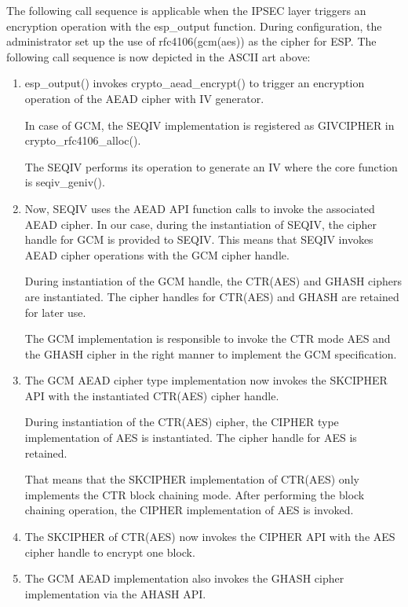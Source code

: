 \documentclass[a4paper,8pt,english]{sphinxmanual}
\begin{document}
The following call sequence is applicable when the IPSEC layer triggers
an encryption operation with the esp\_output function. During
configuration, the administrator set up the use of rfc4106(gcm(aes)) as
the cipher for ESP. The following call sequence is now depicted in the
ASCII art above:
\begin{enumerate}
\item {} 
esp\_output() invokes crypto\_aead\_encrypt() to trigger an
encryption operation of the AEAD cipher with IV generator.

In case of GCM, the SEQIV implementation is registered as GIVCIPHER
in crypto\_rfc4106\_alloc().

The SEQIV performs its operation to generate an IV where the core
function is seqiv\_geniv().

\item {} 
Now, SEQIV uses the AEAD API function calls to invoke the associated
AEAD cipher. In our case, during the instantiation of SEQIV, the
cipher handle for GCM is provided to SEQIV. This means that SEQIV
invokes AEAD cipher operations with the GCM cipher handle.

During instantiation of the GCM handle, the CTR(AES) and GHASH
ciphers are instantiated. The cipher handles for CTR(AES) and GHASH
are retained for later use.

The GCM implementation is responsible to invoke the CTR mode AES and
the GHASH cipher in the right manner to implement the GCM
specification.

\item {} 
The GCM AEAD cipher type implementation now invokes the SKCIPHER API
with the instantiated CTR(AES) cipher handle.

During instantiation of the CTR(AES) cipher, the CIPHER type
implementation of AES is instantiated. The cipher handle for AES is
retained.

That means that the SKCIPHER implementation of CTR(AES) only
implements the CTR block chaining mode. After performing the block
chaining operation, the CIPHER implementation of AES is invoked.

\item {} 
The SKCIPHER of CTR(AES) now invokes the CIPHER API with the AES
cipher handle to encrypt one block.

\item {} 
The GCM AEAD implementation also invokes the GHASH cipher
implementation via the AHASH API.

\end{enumerate}
\end{document}
